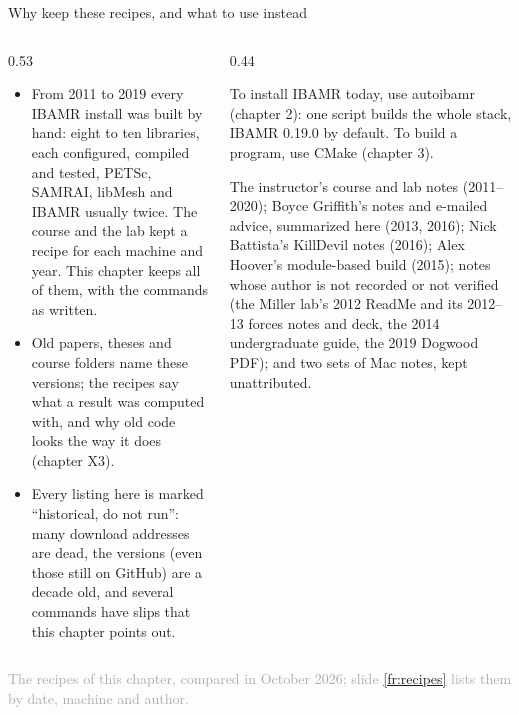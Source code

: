 \documentclass[aspectratio=169,11pt]{beamer}
\newcommand{\sourcecredit}[1]{\vfill\begin{flushright}\tiny\textcolor{DarkGray}{#1}\end{flushright}}
\begin{document}
\begin{frame}{Why keep these recipes, and what to use instead}
\label{fr:why}
\begin{columns}[T,onlytextwidth]
\begin{column}{0.53\textwidth}
\small
\begin{itemize}\setlength{\itemsep}{0.5pt}
  \item {} From 2011 to 2019 every IBAMR install was built by hand: eight to ten libraries, each configured, compiled and tested, PETSc, SAMRAI, libMesh and IBAMR usually twice. The course and the lab kept a recipe for each machine and year. This chapter keeps all of them, with the commands as written.
  \item {} Old papers, theses and course folders name these versions; the recipes say what a result was computed with, and why old code looks the way it does (chapter X3).
  \item {} Every listing here is marked ``historical, do not run'': many download addresses are dead, the versions (even those still on GitHub) are a decade old, and several commands have slips that this chapter points out.
\end{itemize}
\end{column}
\begin{column}{0.44\textwidth}
\begin{punchbox}
\small To install IBAMR today, use autoibamr (chapter 2): one script builds the whole stack, IBAMR 0.19.0 by default. To build a program, use CMake (chapter 3).
\end{punchbox}
\vspace{1mm}
\footnotesize {} The instructor's course and lab notes (2011--2020); Boyce Griffith's notes and e-mailed advice, summarized here (2013, 2016); Nick Battista's KillDevil notes (2016); Alex Hoover's module-based build (2015); notes whose author is not recorded or not verified (the Miller lab's 2012 ReadMe and its 2012--13 forces notes and deck, the 2014 undergraduate guide, the 2019 Dogwood PDF); and two sets of Mac notes, kept unattributed.
\end{column}
\end{columns}
\sourcecredit{The recipes of this chapter, compared in October 2026; slide \ref{fr:recipes} lists them by date, machine and author.}
\end{frame}
\end{document}
